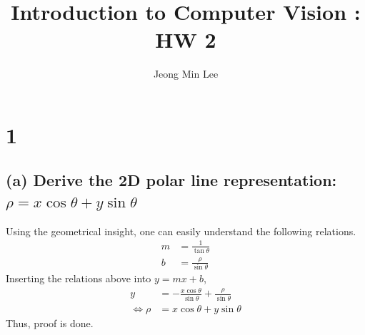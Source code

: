 \documentclass[10pt]{article}
\title{\textbf{Introduction to Computer Vision : HW 2}}
\author{Jeong Min Lee}
\begin{document}
\maketitle

\section*{1}
\subsection*{(a) Derive the 2D polar line representation: $\rho = x\cos\theta +y\sin\theta$}
Using the geometrical insight, one can easily understand the following relations.
\begin{align*}
    m &= \frac{1}{\tan\theta}\\
    b &= \frac{\rho}{\sin\theta}
\end{align*}
Inserting the relations above into $y = mx+b$,
\begin{align*}
    y &= -\frac{x\cos\theta}{\sin\theta} + \frac{\rho}{\sin\theta}\\
    \iff \rho &= x\cos\theta + y\sin\theta
\end{align*}
Thus, proof is done.
\end{document}
